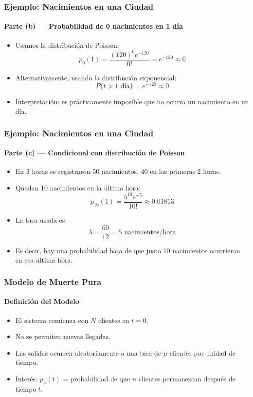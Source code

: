 \documentclass{beamer}
\begin{document}
\begin{frame}
\frametitle{Ejemplo: Nacimientos en una Ciudad}
\framesubtitle{Parte (b) — Probabilidad de 0 nacimientos en 1 día}

\begin{itemize}
    \item Usamos la distribución de Poisson:
    \[
    p_0(1) = \frac{(120)^0 e^{-120}}{0!} = e^{-120} \approx 0
    \]

    \item Alternativamente, usando la distribución exponencial:
    \[
    P\{t > 1 \text{ día}\} = e^{-120} \approx 0
    \]

    \item Interpretación: es prácticamente imposible que no ocurra un nacimiento en un día.
\end{itemize}
\end{frame}

\begin{frame}
\frametitle{Ejemplo: Nacimientos en una Ciudad}
\framesubtitle{Parte (c) — Condicional con distribución de Poisson}

\begin{itemize}
    \item En 3 horas se registraron 50 nacimientos, 40 en las primeras 2 horas.
    \item Quedan 10 nacimientos en la última hora:
    \[
    p_{10}(1) = \frac{5^{10} e^{-5}}{10!} \approx 0.01813
    \]

    \item La tasa usada es:
    \[
    \lambda = \frac{60}{12} = 5 \text{ nacimientos/hora}
    \]
    \item Es decir, hay una probabilidad baja de que justo 10 nacimientos ocurrieran en esa última hora.
\end{itemize}
\end{frame}

\begin{frame}
\frametitle{Modelo de Muerte Pura}
\framesubtitle{Definición del Modelo}

\begin{itemize}
    \item El sistema comienza con $N$ clientes en $t = 0$.
    \item No se permiten nuevas llegadas.
    \item Las salidas ocurren aleatoriamente a una tasa de $\mu$ clientes por unidad de tiempo.
    \item Interés: $p_n(t)$ = probabilidad de que $n$ clientes permanezcan después de tiempo $t$.
\end{itemize}
\end{frame}
\end{document}
